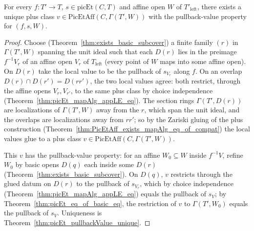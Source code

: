 \begin{theorem}
  \label{thm:picEt_exists_isPullbackValue}
  \leanok
  For every \(f \colon T' \to T\), \(s \in \mathrm{picEt}(C, T)\) and affine open \(W\) of
  \(T'_{\mathrm{left}}\), there exists a unique plus class \(v \in \mathrm{PicEtAff}(C, \Gamma(T',
  W))\) with the pullback-value property for \((f, s, W)\).
\end{theorem}
\begin{proof}
  \leanok
  Choose (Theorem~\ref{thm:exists_basic_subcover}) a finite family \((r)\) in \(\Gamma(T', W)\)
  spanning the unit ideal such that each \(D(r)\) lies in the preimage \(f^{-1}V_r\) of an affine
  open \(V_r\) of \(T_{\mathrm{left}}\) (every point of \(W\) maps into some affine open). On
  \(D(r)\) take the local value to be the pullback of \(s_{V_r}\) along \(f\). On an overlap
  \(D(r) \cap D(r') = D(r r')\), the two local values agree: both restrict, through the affine
  opens \(V_r, V_{r'}\), to the same plus class by choice independence
  (Theorem~\ref{thm:picEt_mapAlg_appLE_eq}). The section rings \(\Gamma(T', D(r))\) are localizations
  of \(\Gamma(T', W)\) away from the \(r\), which span the unit ideal, and the overlaps are
  localizations away from \(r r'\); so by the Zariski gluing of the plus construction
  (Theorem~\ref{thm:PicEtAff_exists_mapAlg_eq_of_compat}) the local values glue to a plus class
  \(v \in \mathrm{PicEtAff}(C, \Gamma(T', W))\).

  This \(v\) has the pullback-value property: for an affine \(W_0 \subseteq W\) inside \(f^{-1}V\),
  refine \(W_0\) by basic opens \(D(q)\) each inside some \(D(r)\)
  (Theorem~\ref{thm:exists_basic_subcover}). On \(D(q)\), \(v\) restricts through the glued datum on
  \(D(r)\) to the pullback of \(s_{V_r}\), which by choice independence
  (Theorem~\ref{thm:picEt_mapAlg_appLE_eq}) equals the pullback of \(s_V\); by
  Theorem~\ref{thm:picEt_eq_of_basic_eq}, the restriction of \(v\) to \(\Gamma(T', W_0)\) equals the
  pullback of \(s_V\). Uniqueness is Theorem~\ref{thm:picEt_pullbackValue_unique}.
\end{proof}

